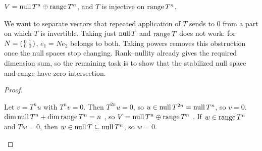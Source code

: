 \documentclass[10pt]{scrartcl}
\begin{document}
\begin{proposition*}\hypertarget{name-ladr-8-4-8-5-splitting-off-the-nilpotent-part}{}\label{name-ladr-8-4-8-5-splitting-off-the-nilpotent-part}
  $V=\operatorname{null} T^n\oplus\operatorname{range} T^n$, and $T$ is injective on $\operatorname{range} T^n$.
\end{proposition*}
\begin{ideabox}
We want to separate vectors that repeated application of $T$ sends to $0$ from a part on which $T$ is invertible. Taking just $\operatorname{null} T$ and $\operatorname{range} T$ does not work: for $N=\begin{psmallmatrix}0&1\\0&0\end{psmallmatrix}$, $e_1=Ne_2$ belongs to both. Taking powers removes this obstruction once the null spaces stop changing. Rank--nullity already gives the required dimension sum, so the remaining task is to show that the stabilized null space and range have zero intersection.
\end{ideabox}
\begin{proof}
  \begin{steps}
    \ii Let $v=T^nu$ with $T^nv=0$. Then $T^{2n}u=0$, so $u\in\operatorname{null} T^{2n}=\operatorname{null} T^n$, so $v=0$.
    \ii $\dim\operatorname{null} T^n+\dim\operatorname{range} T^n=n$ , so $V=\operatorname{null} T^n\oplus\operatorname{range} T^n$ .
    \ii If $w\in\operatorname{range} T^n$ and $Tw=0$, then $w\in\operatorname{null} T\subseteq\operatorname{null} T^n$, so $w=0$.
  \end{steps}
\end{proof}
\end{document}
